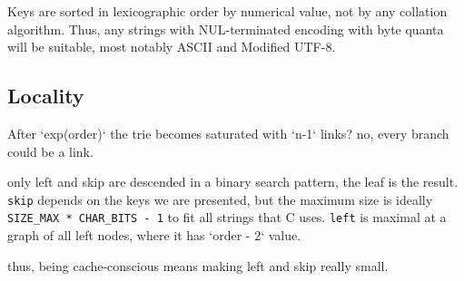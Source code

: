 \documentclass[12pt]{article}
\newcommand{\code}[1]{\colorbox{light-gray}{\texttt{#1}}}
\begin{document}
Keys are sorted in lexicographic order by numerical value, not by any collation algorithm. Thus, any strings with NUL-terminated encoding with byte quanta will be suitable, most notably ASCII and Modified UTF-8.

\subsection{Locality}

After `exp(order)` the trie becomes saturated with `n-1` links? no, every branch could be a link.

only left and skip are descended in a binary search pattern, the leaf is the result. \code{skip} depends on the keys we are presented, but the maximum size is ideally \code{SIZE\_MAX * CHAR\_BITS - 1} to fit all strings that C uses. \code{left} is maximal at a graph of all left nodes, where it has `order - 2` value.

thus, being cache-conscious means making left and skip really small.
\end{document}
